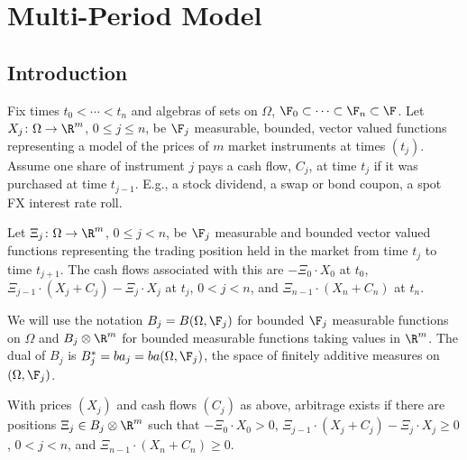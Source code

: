 \chapter{Multi-Period Model}

\section{Introduction}
\label{mpm-intro}

Fix times $t_0 < \cdots < t_n$ and algebras of sets on $\Omega$,
$\F_0\subset\dots\subset\F_n\subset\F$.  Let $X_j\colon\Omega\to\R^m$,
$0\le j \le n$, be $\F_j$ measurable, bounded, vector valued functions
representing a model of the prices of  $m$ market instruments at times
$(t_j)$.  Assume one share of instrument $j$ pays a cash flow, $C_j$,
at time $t_j$ if it was purchased at time $t_{j-1}$. E.g., a stock
dividend, a swap or bond coupon, a spot FX interest rate roll.

Let $\Xi_j\colon\Omega\to\R^m$, $0\le j < n$, be $\F_j$ measurable
and bounded vector valued functions representing the trading position
held in the market from time $t_j$ to time $t_{j+1}$.  The cash flows
associated with this are $-\Xi_0\cdot X_0$ at $t_0$, $\Xi_{j - 1}\cdot
(X_j + C_j) - \Xi_j\cdot X_j$ at $t_j$, $0 < j < n$, and $\Xi_{n-1}\cdot
(X_n + C_n)$ at $t_n$.

We will use the notation $B_j = B(\Omega, \F_j)$ for bounded
$\F_j$ measurable functions on $\Omega$ and
$B_j\otimes\R^m$ for bounded measurable functions taking values in $\R^m$.
The dual of $B_j$ is $B_j^* = ba_j = ba(\Omega, \F_j)$, the space of
finitely additive measures on $(\Omega, \F_j)$.

\begin{definition}
With prices $(X_j)$ and cash flows $(C_j)$ as above, 
arbitrage exists if there are positions
$\Xi_j\in B_j\otimes\R^m$ such that 
$-\Xi_0\cdot X_0 > 0$,
$\Xi_{j - 1}\cdot (X_j + C_j) - \Xi_j\cdot X_j\ge0$, $0 < j < n$,
and $\Xi_{n-1}\cdot (X_n + C_n)\ge0$.
\end{definition}


